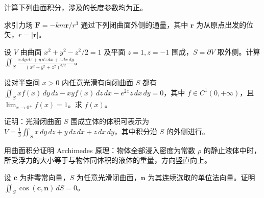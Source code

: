 \noindent\begin{minipage}{\textwidth}
计算下列曲面积分，涉及的长度参数均为正。
\end{minipage}\par\vfill
\noindent\begin{minipage}{\textwidth}
求引力场 $\boldsymbol F=-km\boldsymbol r/r^3$ 通过下列闭曲面外侧的通量，其中 $\boldsymbol r$ 为从原点出发的位矢，$r=|\boldsymbol r|$。
\end{minipage}\par\vfill
\newpage
\noindent\begin{minipage}{\textwidth}
设 $V$ 由曲面 $x^2+y^2-z^2/2=1$ 及平面 $z=1,z=-1$ 围成，$S=\partial V$ 取外侧。计算 $\displaystyle\iint_S\frac{x\,dy\,dz+y\,dz\,dx+z\,dx\,dy}{(x^2+y^2+z^2)^{3/2}}$。
\end{minipage}\par\vfill
\noindent\begin{minipage}{\textwidth}
设对半空间 $x>0$ 内任意光滑有向闭曲面 $S$ 都有 $\displaystyle\iint_Sxf(x)\,dy\,dz-xyf(x)\,dz\,dx-e^{2x}z\,dx\,dy=0$，其中 $f\in C^1(0,+\infty)$，且 $\lim_{x\to0^+}f(x)=1$。求 $f(x)$。
\end{minipage}\par\vfill
\noindent\begin{minipage}{\textwidth}
证明：光滑闭曲面 $S$ 围成立体的体积可表示为 $\displaystyle V=\frac13\iint_Sx\,dy\,dz+y\,dz\,dx+z\,dx\,dy$，其中积分沿 $S$ 的外侧进行。
\end{minipage}\par\vfill
\noindent\begin{minipage}{\textwidth}
用曲面积分证明 Archimedes 原理：物体全部浸入密度为常数 $\rho$ 的静止液体中时，所受浮力的大小等于与物体同体积的液体的重量，方向竖直向上。
\end{minipage}\par\vfill
\newpage
\noindent\begin{minipage}{\textwidth}
设 $\boldsymbol c$ 为非零常向量，$S$ 为任意光滑闭曲面，$\boldsymbol n$ 为其连续选取的单位法向量。证明 $\displaystyle\iint_S\cos(\boldsymbol c,\boldsymbol n)\,dS=0$。
\end{minipage}\par\vfill
